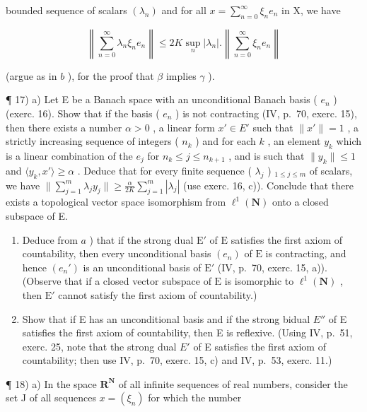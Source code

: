 bounded sequence of scalars \((\lambda_{n})\) and for all \(x = \sum_{n=0}^{\infty} \xi_{n} e_{n}\) in X, we have

\[
\left\| \sum_ {n = 0} ^ {\infty} \lambda_ {n} \xi_ {n} e _ {n} \right\| \leqslant 2 K \sup _ {n} | \lambda_ {n} |. \left\| \sum_ {n = 0} ^ {\infty} \xi_ {n} e _ {n} \right\|
\]

(argue as in \(b\) ), for the proof that \(\beta\) implies \(\gamma\) ).

¶ 17) a) Let E be a Banach space with an unconditional Banach basis ( \(e_n\) ) (exerc. 16). Show that if the basis ( \(e_n\) ) is not contracting (IV, p.~70, exerc. 15), then there exists a number \(\alpha > 0\) , a linear form \(x' \in E'\) such that \(\|x'\| = 1\) , a strictly increasing sequence of integers ( \(n_k\) ) and for each \(k\) , an element \(y_k\) which is a linear combination of the \(e_j\) for \(n_k \leqslant j \leqslant n_{k+1}\) , and is such that \(\|y_k\| \leqslant 1\) and \(\langle y_k, x' \rangle \geqslant \alpha\) . Deduce that for every finite sequence ( \(\lambda_j\) ) \(_{1 \leqslant j \leqslant m}\) of scalars, we have \(\|\sum_{j=1}^{m} \lambda_j y_j\| \geqslant \frac{\alpha}{2K} \sum_{j=1}^{m} |\lambda_j|\) (use exerc. 16, c)). Conclude that there exists a topological vector space isomorphism from \(\ell^1 (\mathbf{N})\) onto a closed subspace of E.

\begin{enumerate}
\def\labelenumi{\alph{enumi})}
\setcounter{enumi}{1}
\item
  Deduce from \(a\) ) that if the strong dual \(\mathrm{E}'\) of \(\mathrm{E}\) satisfies the first axiom of countability, then every unconditional basis \((e_n)\) of \(\mathrm{E}\) is contracting, and hence \((e_n')\) is an unconditional basis of \(\mathrm{E}'\) (IV, p.~70, exerc. 15, a)). (Observe that if a closed vector subspace of \(\mathrm{E}\) is isomorphic to \(\ell^1(\mathbf{N})\) , then \(\mathrm{E}'\) cannot satisfy the first axiom of countability.)
\item
  Show that if E has an unconditional basis and if the strong bidual \(E''\) of E satisfies the first axiom of countability, then E is reflexive. (Using IV, p.~51, exerc. 25, note that the strong dual \(E'\) of E satisfies the first axiom of countability; then use IV, p.~70, exerc. 15, c) and IV, p.~53, exerc. 11.)
\end{enumerate}

¶ 18) a) In the space \(\mathbf{R}^{\mathbf{N}}\) of all infinite sequences of real numbers, consider the set J of all sequences \(x = (\xi_n)\) for which the number

